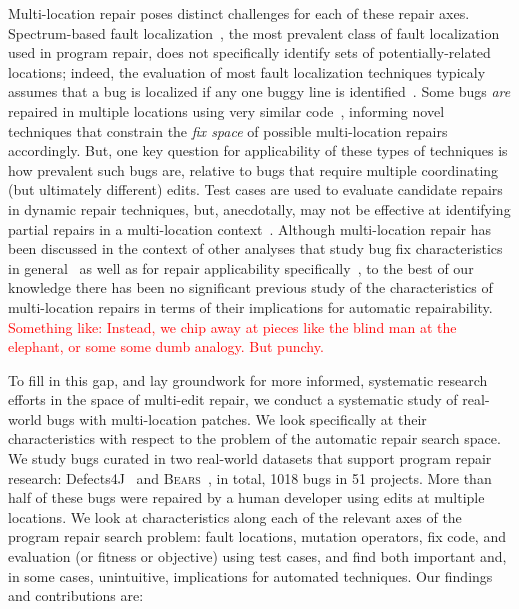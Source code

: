 \documentclass[10pt, conference]{IEEEtran}
\newcommand\todo[1]{\textcolor{red}{#1}}
\newcommand\bears{\textsc{Bears}\xspace}
\begin{document}
Multi-location repair poses distinct challenges for each of these repair axes.
Spectrum-based fault localization~\cite{ochiai}, the most prevalent class of
fault localization used in program repair, does not specifically
identify sets of potentially-related locations; indeed,
the evaluation of most fault localization techniques typicaly assumes that a bug
is localized if any one buggy line is identified~\cite{fl-survey-wong}.
Some bugs \emph{are}
repaired in multiple locations using very similar
code~\cite{saha2019harnessing,jiang2019cmsuggester}, informing novel techniques
that constrain the \emph{fix space} of possible multi-location repairs accordingly.
But, one key question for applicability of these types of techniques is how prevalent
such bugs are, relative to bugs that require multiple
coordinating (but ultimately different) edits.
Test cases are used to evaluate candidate repairs in dynamic
repair techniques, but, anecdotally, may not be effective
at identifying partial repairs in a multi-location
context~\cite{better-fitness}.  
Although multi-location repair has been discussed in the context of other analyses
that study bug fix characteristics in general~\cite{d4j-dissection} as well as for
repair applicability specifically~\cite{zhong2015, wang2018}, to the best of our
knowledge there has been no significant previous study of the characteristics of
multi-location repairs in terms of their implications for automatic
repairability.  \todo{Something like: Instead, we chip away at pieces like the
  blind man at the elephant, or some some dumb analogy.  But punchy.}

To fill in this gap, and lay groundwork for more informed, systematic research
efforts in the space of multi-edit repair, we conduct a systematic study of real-world bugs with
multi-location patches.  We
look specifically at their characteristics with respect to the problem of the
automatic repair search space.  
We study bugs curated in two
real-world datasets that support program repair research: Defects4J~\cite{defects4j}
and \bears~\cite{bears}, in total, 1018 bugs in 51 projects.
More than half of these bugs were repaired by a
human developer using edits at multiple locations.  We look at characteristics along each of the
relevant axes of the program repair search problem: fault locations, mutation
operators, fix code, and evaluation (or fitness or objective) using test cases,
and find both important and, in some cases, unintuitive, implications for
automated techniques.  Our findings and contributions are:
\end{document}
